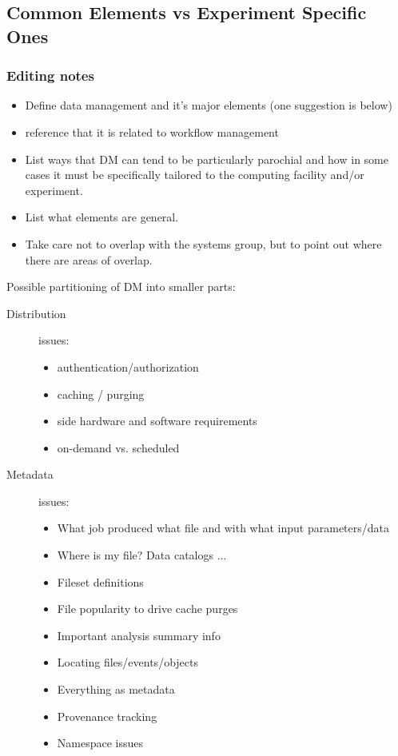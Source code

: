 \subsection{Common Elements vs Experiment Specific Ones}



\subsubsection{Editing notes}


\begin{itemize}
\item Define data management and it's major elements (one suggestion is below)
\item reference that it is related to workflow management
\item List ways that DM can tend to be particularly parochial and how in some cases it must be specifically tailored to the computing facility and/or experiment.
\item List what elements are general.
\item Take care not to overlap with the systems group, but to point out where there are areas of overlap.
\end{itemize}
Possible partitioning of DM into smaller parts:
\begin{description}
\item[Distribution] issues:
  \begin{itemize}
  \item authentication/authorization
  \item caching / purging
  \item side hardware and software requirements
  \item on-demand vs. scheduled
  \end{itemize}
\item[Metadata] issues:
  \begin{itemize}
  \item What job produced what file and with what input parameters/data
  \item Where is my file? Data catalogs ...
  \item Fileset definitions
  \item File popularity to drive cache purges
  \item Important analysis summary info
  \item Locating files/events/objects
  \item Everything as metadata
  \item Provenance tracking
  \item Namespace issues
  \end{itemize}
\end{description}



